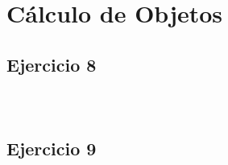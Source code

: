 \documentclass[10pt,a4paper]{article}
\begin{document}
\subsubsection{}
    \begin{lstlisting}
    \end{lstlisting}
\subsubsection{}
    \begin{lstlisting}
    \end{lstlisting}
\subsubsection{}
    \begin{lstlisting}
    \end{lstlisting}

\section*{\centering Cálculo de Objetos}

\subsection{Ejercicio 8}
\subsubsection{}
    \begin{lstlisting}
    \end{lstlisting}
\subsubsection{}
    \begin{lstlisting}
    \end{lstlisting}
\subsection{Ejercicio 9}
\subsubsection{}
    \begin{lstlisting}
    \end{lstlisting}
\subsubsection{}
    \begin{lstlisting}
    \end{lstlisting}
\end{document}
